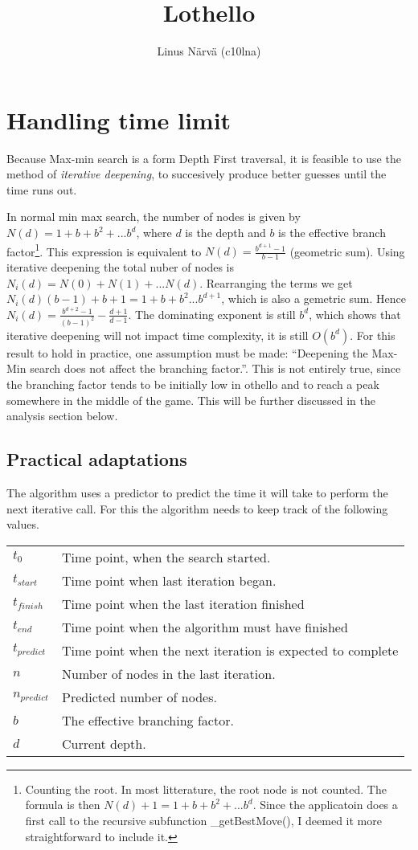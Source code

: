 \documentclass[a4paper,11pt]{article}
\title{Lothello}
\author{Linus Närvä (c10lna)}
\begin{document}
\maketitle

\section{Handling time limit}
Because Max-min search is a form Depth First traversal, it is feasible to use the method of \textit{iterative deepening}, to succesively produce better guesses until the time runs out.

In normal min max search, the number of nodes is given by $N(d) = 1 + b + b^2 + ... b^d$, where $d$ is the depth and $b$ is the effective branch factor\footnote{Counting the root. In most litterature, the root node is not counted. The formula is then $N(d) +1 = 1 + b + b^2 + ... b^d$. Since the applicatoin does a first call to the recursive subfunction \_getBestMove(), I deemed it more straightforward to include it.}. This expression is equivalent to $N(d) = \frac{b^{d+1} -1}{b -1}$ (geometric sum). Using iterative deepening the total nuber of nodes is $N_i(d) = N(0) + N(1) + ... N(d)$. Rearranging the terms we get $N_i(d)(b-1) + b + 1= 1 + b + b^2 ... b^{d+1}$, which is also a gemetric sum. Hence $N_i(d) = \frac{b^{d+2} - 1}{(b - 1)^2} - \frac{d+1}{d-1}$. The dominating exponent is still $b^d$, which shows that iterative deepening will not impact time complexity, it is still $O(b^d)$. For this result to hold in practice, one assumption must be made: ``Deepening the Max-Min search does not affect the branching factor.''. This is not entirely true, since the branching factor tends to be initially low in othello and to reach a peak somewhere in the middle of the game. This will be further discussed in the analysis section below.

\subsection{Practical adaptations}
The algorithm uses a predictor to predict the time it will take to perform the next iterative call. For this the algorithm needs to keep track of the following values.

\begin{tabular}{l l}
$t_0$ & Time point, when the search started. \\
$t_{start}$ & Time point when last iteration began. \\
$t_{finish}$ & Time point when the last iteration finished \\
$t_{end}$ & Time point when the algorithm must have finished \\
$t_{predict}$ & Time point when the next iteration is expected to complete \\
$n$ & Number of nodes in the last iteration. \\
$n_{predict}$ & Predicted number of nodes. \\
$b$ & The effective branching factor. \\
$d$ & Current depth. \\
\end{tabular}
\end{document}
